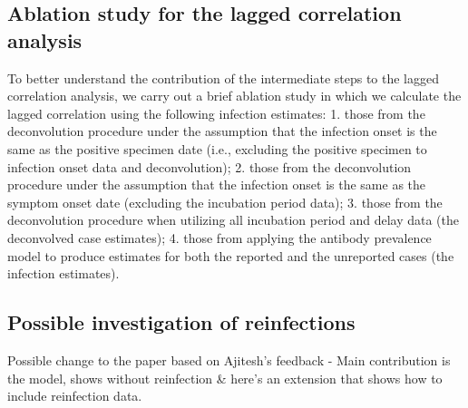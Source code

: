 \documentclass{article}
\begin{document}
\subsection{Ablation study for the lagged correlation analysis} 

To better understand the contribution of the intermediate steps to the lagged
correlation analysis, we carry out a brief ablation study in which we calculate
the lagged correlation using the following infection estimates: 1. those from
the deconvolution procedure under the assumption that the infection onset is the
same as the positive specimen date (i.e., excluding the positive specimen to
infection onset data and deconvolution); 2. those from the deconvolution
procedure under the assumption that the infection onset is the same as the
symptom onset date (excluding the incubation period data); 3. those from the
deconvolution procedure when utilizing all incubation period and delay data (the
deconvolved case estimates); 4. those from applying the antibody prevalence
model to produce estimates for both the reported and the unreported cases (the
infection estimates).


\subsection{Possible investigation of reinfections}

Possible change to the paper based on Ajitesh's feedback - 
Main contribution is the model, shows without reinfection 
\& here's an extension that shows how to include reinfection data. 
\end{document}
